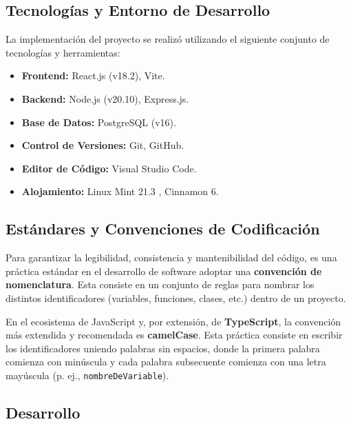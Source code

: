 \documentclass[12pt,letterpaper,spanish]{report}
\begin{document}
\subsection{Tecnologías y Entorno de Desarrollo}
\label{sec:tecnologias_entorno}

La implementación del proyecto se realizó utilizando el siguiente conjunto de tecnologías y herramientas:
\begin{itemize}
    \item \textbf{Frontend:} React.js (v18.2), Vite.
    \item \textbf{Backend:} Node.js (v20.10), Express.js.
    \item \textbf{Base de Datos:} PostgreSQL (v16).
    \item \textbf{Control de Versiones:} Git, GitHub.
    \item \textbf{Editor de Código:} Visual Studio Code.
    \item \textbf{Alojamiento:} Linux Mint 21.3 , Cinnamon 6.
\end{itemize}


\subsection{Estándares y Convenciones de Codificación}
\label{sec:estandares_codigo}

Para garantizar la legibilidad, consistencia y mantenibilidad del código, es una práctica estándar en el desarrollo de software adoptar una \textbf{convención de nomenclatura}. Esta consiste en un conjunto de reglas para nombrar los distintos identificadores (variables, funciones, clases, etc.) dentro de un proyecto.

En el ecosistema de JavaScript y, por extensión, de \textbf{TypeScript}, la convención más extendida y recomendada es \textbf{camelCase}. Esta práctica consiste en escribir los identificadores uniendo palabras sin espacios, donde la primera palabra comienza con minúscula y cada palabra subsecuente comienza con una letra mayúscula (p. ej., \texttt{nombreDeVariable}).




\subsection{Desarrollo}

\label{sec:evolucion_dashboard}
\end{document}
